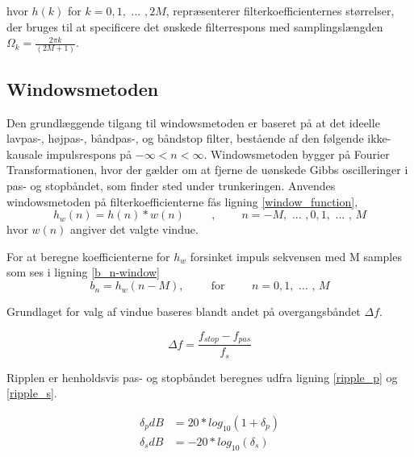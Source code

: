 hvor $h(k)$ for $k=0,1,\text{ ... },2M$, repræsenterer filterkoefficienternes størrelser, der bruges til at specificere det ønskede filterrespons med samplingslængden $\Omega_{k}=\frac{2\pi k}{(2M+1)}$.



\subsection{Windowsmetoden}
Den grundlæggende tilgang til windowsmetoden er baseret på at det ideelle lavpas-, højpas-, båndpas-, og båndstop filter, bestående af den følgende ikke-kausale impulsrespons på $-\infty < n < \infty$. Windowsmetoden bygger på Fourier Transformationen, hvor der gælder om at fjerne de uønskede Gibbs oscilleringer i pas- og stopbåndet, som finder sted under trunkeringen. Anvendes windowsmetoden på filterkoefficienterne fås ligning \ref{window_function},
\begin{equation}
	h_w(n) = h(n)*w(n) \hspace{1cm}\text{,} \hspace{1cm}n=-M,\text{ ... },0, 1,\text{ ... , }M	
	\label{window_function}
\end{equation}
hvor $w(n)$ angiver det valgte vindue.

For at beregne koefficienterne for $h_w$ forsinket impuls sekvensen med M samples som ses i ligning \ref{b_n-window}
\begin{equation}
	b_n = h_w (n-M), \hspace{1cm} \text{for} \hspace{1cm} n = 0,1, \text{ ... , }M \label{b_n-window}
\end{equation}

Grundlaget for valg af vindue baseres blandt andet på overgangsbåndet $\Delta f$.

\begin{equation}
\Delta f = \frac{f_{stop}-f_{pas}}{f_s} \label{Windows_transistionband}
\end{equation}

Ripplen er henholdsvis pas- og stopbåndet beregnes udfra ligning \ref{ripple_p} og \ref{ripple_s}.

\begin{align}
\delta_p dB &= 20*log_{10}(1+\delta_p) \label{ripple_p}\\
\delta_s dB &= -20*log_{10}(\delta_s) \label{ripple_s}
\end{align}

